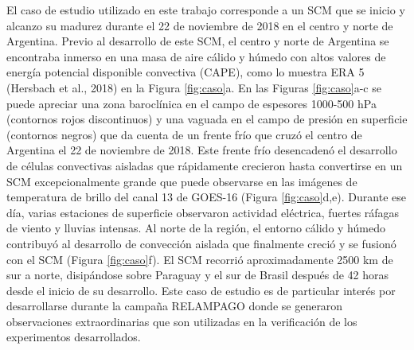 \documentclass[12pt,oneside,a4paper]{reedthesis}
\begin{document}
El caso de estudio utilizado en este trabajo corresponde a un SCM que se inicio y alcanzo su madurez durante el 22 de noviembre de 2018 en el centro y norte de Argentina. Previo al desarrollo de este SCM, el centro y norte de Argentina se encontraba inmerso en una masa de aire cálido y húmedo con altos valores de energía potencial disponible convectiva (CAPE), como lo muestra ERA 5 (Hersbach et al., 2018) en la Figura \ref{fig:caso}a. En las Figuras \ref{fig:caso}a-c se puede apreciar una zona baroclínica en el campo de espesores 1000-500 hPa (contornos rojos discontinuos) y una vaguada en el campo de presión en superficie (contornos negros) que da cuenta de un frente frío que cruzó el centro de Argentina el 22 de noviembre de 2018. Este frente frío desencadenó el desarrollo de células convectivas aisladas que rápidamente crecieron hasta convertirse en un SCM excepcionalmente grande que puede observarse en las imágenes de temperatura de brillo del canal 13 de GOES-16 (Figura \ref{fig:caso}d,e). Durante ese día, varias estaciones de superficie observaron actividad eléctrica, fuertes ráfagas de viento y lluvias intensas. Al norte de la región, el entorno cálido y húmedo contribuyó al desarrollo de convección aislada que finalmente creció y se fusionó con el SCM (Figura \ref{fig:caso}f). El SCM recorrió aproximadamente 2500 km de sur a norte, disipándose sobre Paraguay y el sur de Brasil después de 42 horas desde el inicio de su desarrollo. Este caso de estudio es de particular interés por desarrollarse durante la campaña RELAMPAGO donde se generaron observaciones extraordinarias que son utilizadas en la verificación de los experimentos desarrollados.
\end{document}
